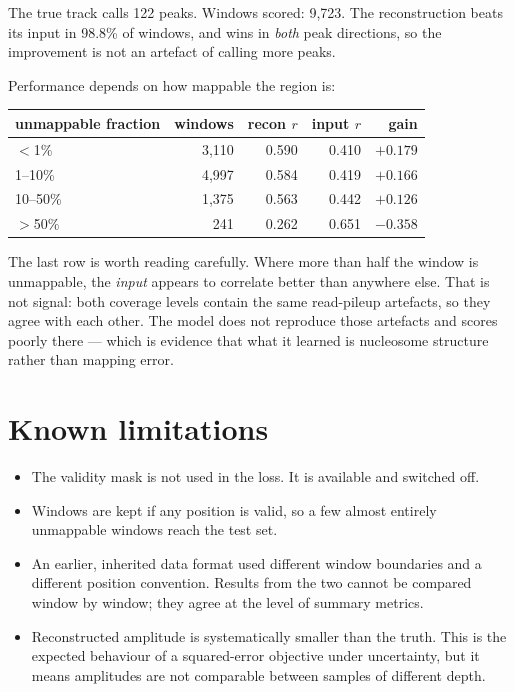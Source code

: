 \documentclass[11pt,a4paper]{article}
\begin{document}
The true track calls 122 peaks. Windows scored: 9{,}723. The reconstruction beats
its input in 98.8\% of windows, and wins in \emph{both} peak directions, so the
improvement is not an artefact of calling more peaks.

Performance depends on how mappable the region is:

\begin{center}
\begin{tabular}{lrrrr}
\toprule
\textbf{unmappable fraction} & \textbf{windows} & \textbf{recon $r$} & \textbf{input $r$} & \textbf{gain} \\
\midrule
$<$1\%      & 3{,}110 & 0.590 & 0.410 & $+0.179$ \\
1--10\%     & 4{,}997 & 0.584 & 0.419 & $+0.166$ \\
10--50\%    & 1{,}375 & 0.563 & 0.442 & $+0.126$ \\
$>$50\%     &    241  & 0.262 & 0.651 & $-0.358$ \\
\bottomrule
\end{tabular}
\end{center}

The last row is worth reading carefully. Where more than half the window is
unmappable, the \emph{input} appears to correlate better than anywhere else. That is
not signal: both coverage levels contain the same read-pileup artefacts, so they
agree with each other. The model does not reproduce those artefacts and scores
poorly there --- which is evidence that what it learned is nucleosome structure
rather than mapping error.

\section{Known limitations}

\begin{itemize}
\item The validity mask is not used in the loss. It is available and switched off.
\item Windows are kept if any position is valid, so a few almost entirely
      unmappable windows reach the test set.
\item An earlier, inherited data format used different window boundaries and a
      different position convention. Results from the two cannot be compared window
      by window; they agree at the level of summary metrics.
\item Reconstructed amplitude is systematically smaller than the truth. This is the
      expected behaviour of a squared-error objective under uncertainty, but it
      means amplitudes are not comparable between samples of different depth.
\end{itemize}
\end{document}
